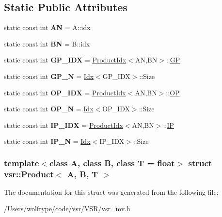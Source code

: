 \subsection*{Static Public Attributes}
\begin{DoxyCompactItemize}
\item 
\hypertarget{structvsr_1_1_product_a8f6a498d9cc0a70174e89973d9ecdef5}{static const int {\bfseries A\-N} = A\-::idx}\label{structvsr_1_1_product_a8f6a498d9cc0a70174e89973d9ecdef5}

\item 
\hypertarget{structvsr_1_1_product_aec265ea5c389b3c5b46ce7825eb1282f}{static const int {\bfseries B\-N} = B\-::idx}\label{structvsr_1_1_product_aec265ea5c389b3c5b46ce7825eb1282f}

\item 
\hypertarget{structvsr_1_1_product_a44bacb6046750fc98b97b1c93419319f}{static const int {\bfseries G\-P\-\_\-\-I\-D\-X} = \hyperlink{structvsr_1_1_product_idx}{Product\-Idx}$<$A\-N,B\-N$>$\-::\hyperlink{classvsr_1_1_m_v}{G\-P}}\label{structvsr_1_1_product_a44bacb6046750fc98b97b1c93419319f}

\item 
\hypertarget{structvsr_1_1_product_ac4cf8e376b379099176e452cf19f8b3d}{static const int {\bfseries G\-P\-\_\-\-N} = \hyperlink{structvsr_1_1_idx}{Idx}$<$G\-P\-\_\-\-I\-D\-X$>$\-::Size}\label{structvsr_1_1_product_ac4cf8e376b379099176e452cf19f8b3d}

\item 
\hypertarget{structvsr_1_1_product_a1dd790592ae67e1a01ea862dd25f466a}{static const int {\bfseries O\-P\-\_\-\-I\-D\-X} = \hyperlink{structvsr_1_1_product_idx}{Product\-Idx}$<$A\-N,B\-N$>$\-::\hyperlink{classvsr_1_1_m_v}{O\-P}}\label{structvsr_1_1_product_a1dd790592ae67e1a01ea862dd25f466a}

\item 
\hypertarget{structvsr_1_1_product_aac09f136a87ee42b0de63e9ca2afb586}{static const int {\bfseries O\-P\-\_\-\-N} = \hyperlink{structvsr_1_1_idx}{Idx}$<$O\-P\-\_\-\-I\-D\-X$>$\-::Size}\label{structvsr_1_1_product_aac09f136a87ee42b0de63e9ca2afb586}

\item 
\hypertarget{structvsr_1_1_product_a65a06b0685ed47b7a6e0bbb53f5e15b6}{static const int {\bfseries I\-P\-\_\-\-I\-D\-X} = \hyperlink{structvsr_1_1_product_idx}{Product\-Idx}$<$A\-N,B\-N$>$\-::\hyperlink{classvsr_1_1_m_v}{I\-P}}\label{structvsr_1_1_product_a65a06b0685ed47b7a6e0bbb53f5e15b6}

\item 
\hypertarget{structvsr_1_1_product_acf71b86edab69bbf4fff53db6d3c1aaa}{static const int {\bfseries I\-P\-\_\-\-N} = \hyperlink{structvsr_1_1_idx}{Idx}$<$I\-P\-\_\-\-I\-D\-X$>$\-::Size}\label{structvsr_1_1_product_acf71b86edab69bbf4fff53db6d3c1aaa}

\end{DoxyCompactItemize}
\subsubsection*{template$<$class A, class B, class T = float$>$ struct vsr\-::\-Product$<$ A, B, T $>$}



The documentation for this struct was generated from the following file\-:\begin{DoxyCompactItemize}
\item 
/\-Users/wolftype/code/vsr/\-V\-S\-R/vsr\-\_\-mv.\-h\end{DoxyCompactItemize}
